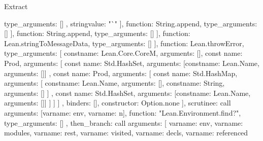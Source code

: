 \begin{lexlean}{Extract}
\begin{toolingmodule}
{{{{{{{{{{{{                                      type_arguments: []
                                    },
                                    string{value: "`"}
                                  ],
                                  function: String.append,
                                  type_arguments: []
                                }
                              ],
                              function: String.append,
                              type_arguments: []
                            }
                          ],
                          function: Lean.stringToMessageData,
                          type_arguments: []
                        }
                      ],
                      function: Lean.throwError,
                      type_arguments: [
                        const{name: Lean.Core.CoreM, arguments: []},
                        const{
                          name: Prod,
                          arguments: [
                            const{
                              name: Std.HashSet,
                              arguments: [const{name: Lean.Name, arguments: []}]
                            },
                            const{
                              name: Prod,
                              arguments: [
                                const{
                                  name: Std.HashMap,
                                  arguments: [
                                    const{name: Lean.Name, arguments: []},
                                    const{name: String, arguments: []}
                                  ]
                                },
                                const{
                                  name: Std.HashSet,
                                  arguments: [const{name: Lean.Name, arguments: []}]
                                }
                              ]
                            }
                          ]
                        }
                      ]
                    },
                    binders: [],
                    constructor: Option.none
                  }
                ],
                scrutinee: call{
                  arguments: [var{name: env}, var{name: n}],
                  function: "Lean.Environment.find?",
                  type_arguments: []
                }
              },
              then_branch: call{
                arguments: [
                  var{name: env},
                  var{name: modules},
                  var{name: rest},
                  var{name: visited},
                  var{name: decls},
                  var{name: referenced}
}}}}}}
\end{toolingmodule}
\end{lexlean}
